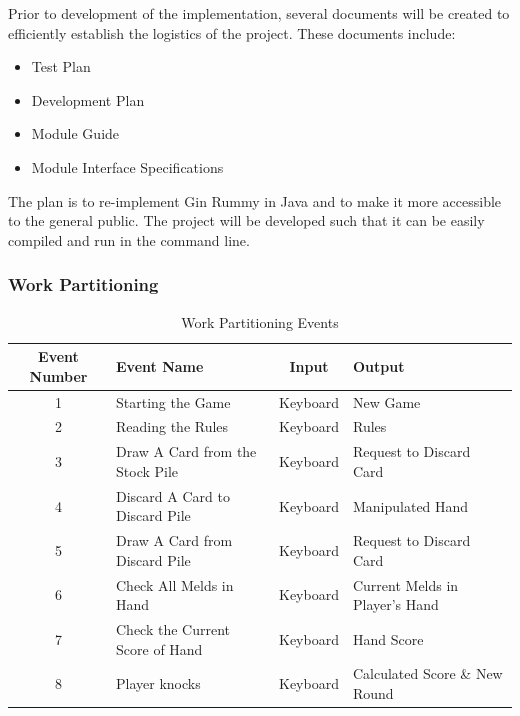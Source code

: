 \documentclass[12pt, titlepage]{article}
\begin{document}
Prior to development of the implementation, several documents will be created to efficiently establish the logistics of the project. These documents include:
\begin{itemize}
    \item Test Plan
    \item Development Plan
    \item Module Guide
    \item Module Interface Specifications
\end{itemize}

The plan is to re-implement Gin Rummy in Java and to make it more accessible to the general public. The project will be developed such that it can be easily compiled and run in the command line.

\subsubsection{Work Partitioning}
\begin{table}[H]
\caption{Work Partitioning Events}
    \centering
    \begin{tabular}{|c|p{3.5cm}|c|p{3.5cm}|}
    \hline
    \textbf{Event Number} & \centering\textbf{Event Name} & \textbf{Input} & \textbf{Output} \\
    \hline
    1 & Starting the Game & Keyboard & New Game \\
    \hline
    2 & Reading the Rules & Keyboard & Rules \\
    \hline
    3 & Draw A Card from the Stock Pile & Keyboard & Request to Discard Card \\
    \hline
    4 & Discard A Card to Discard Pile & Keyboard & Manipulated Hand \\
    \hline
    5 & Draw A Card from Discard Pile & Keyboard & Request to Discard Card \\
    \hline
    6 & Check All Melds in Hand & Keyboard & Current Melds in Player's Hand \\
    \hline
    7 & Check the Current Score of Hand & Keyboard & Hand Score \\
    \hline
    8 & Player knocks & Keyboard & Calculated Score \& New Round \\
    \hline
    \end{tabular}
\end{table}
\end{document}
